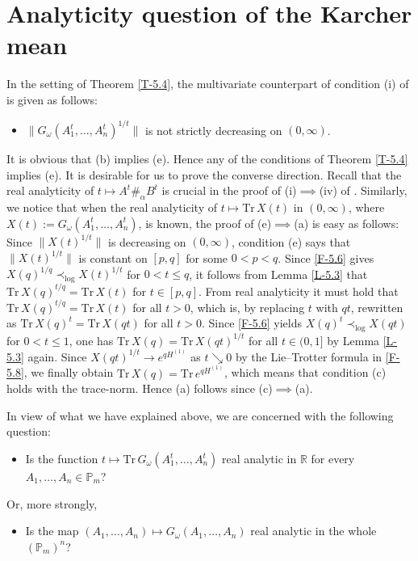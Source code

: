 \documentclass[11pt,reqno]{article}
\numberwithin{equation}{section}
\def\bR{\mathbb{R}}
\def\bP{\mathbb{P}}
\def\Tr{\mathrm{Tr}}
\begin{document}
\section{Analyticity question of the Karcher mean}\label{Sec-6}

In the setting of Theorem \ref{T-5.4}, the multivariate counterpart of condition (i) of \cite[Theorem 3.1]{Hi} is
given as follows:
\begin{itemize}
\item[(e)] $\|G_\omega(A_1^t,\dots,A_n^t)^{1/t}\|$ is not strictly decreasing on $(0,\infty)$.
\end{itemize}
It is obvious that (b) implies (e). Hence any of the conditions of Theorem \ref{T-5.4} implies (e). It is desirable
for us to prove the converse direction. Recall that the real analyticity of $t\mapsto A^t\#_\alpha B^t$ is crucial in
the proof of (i)$\implies$(iv) of \cite[Theorem 3.1]{Hi}. Similarly, we notice that when the real analyticity of
$t\mapsto\Tr\,X(t)$ in $(0,\infty)$, where $X(t):=G_\omega(A_1^t,\dots,A_n^t)$, is known, the proof of
(e)$\implies$(a) is easy as follows: Since $\|X(t)^{1/t}\|$ is decreasing on $(0,\infty)$, condition (e) says that
$\|X(t)^{1/t}\|$ is constant on $[p,q]$ for some $0<p<q$. Since \eqref{F-5.6} gives
$X(q)^{1/q}\prec_{\log}X(t)^{1/t}$ for $0<t\le q$, it follows from Lemma \ref{L-5.3} that  $\Tr\,X(q)^{t/q}=\Tr\,X(t)$
for $t\in[p,q]$. From real analyticity it must hold that $\Tr\,X(q)^{t/q}=\Tr\,X(t)$ for all $t>0$, which is, by
replacing $t$ with $qt$, rewritten as $\Tr\,X(q)^t=\Tr\,X(qt)$ for all $t>0$. Since \eqref{F-5.6} yields
$X(q)^t\prec_{\log}X(qt)$ for $0<t\le1$, one has $\Tr\,X(q)=\Tr\,X(qt)^{1/t}$ for all $t\in(0,1]$ by Lemma \ref{L-5.3}
again. Since $X(qt)^{1/t}\to e^{qH^{(1)}}$ as $t\searrow0$ by the Lie--Trotter formula in \eqref{F-5.8}, we finally
obtain $\Tr\,X(q)=\Tr\,e^{qH^{(1)}}$, which means that condition (c) holds with the trace-norm. Hence (a) follows
since (c)$\implies$(a).

In view of what we have explained above, we are concerned with the following question:
\begin{itemize}
\item[(A)] Is the function $t\mapsto\Tr\,G_\omega(A_1^t,\dots,A_n^t)$ real analytic in $\bR$ for every 
$A_1,\dots,A_n\in\bP_m$?
\end{itemize}
Or, more strongly,
\begin{itemize}
\item[(B)] Is the map $(A_1,\dots,A_n)\mapsto G_\omega(A_1,\dots,A_n)$ real analytic in the whole
$(\bP_m)^n$?
\end{itemize}
\end{document}
